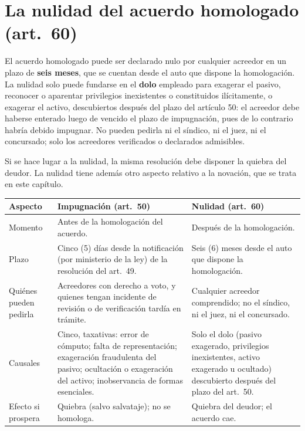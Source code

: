 \documentclass[12pt,oneside]{book}
\begin{document}
\section{La nulidad del acuerdo homologado (art.\ 60)}

El acuerdo homologado puede ser declarado nulo por cualquier acreedor en un plazo de \textbf{seis meses}, que se cuentan desde el auto que dispone la homologación. La nulidad solo puede fundarse en el \textbf{dolo} empleado para exagerar el pasivo, reconocer o aparentar privilegios inexistentes o constituidos ilícitamente, o exagerar el activo, descubiertos después del plazo del artículo 50: el acreedor debe haberse enterado luego de vencido el plazo de impugnación, pues de lo contrario habría debido impugnar. No pueden pedirla ni el síndico, ni el juez, ni el concursado; solo los acreedores verificados o declarados admisibles.

Si se hace lugar a la nulidad, la misma resolución debe disponer la quiebra del deudor. La nulidad tiene además otro aspecto relativo a la novación, que se trata en este capítulo.

\begin{center}
\small
\begin{tabularx}{\textwidth}{P{2.6cm} Y Y}
\toprule
\textbf{Aspecto} & \textbf{Impugnación (art.\ 50)} & \textbf{Nulidad (art.\ 60)} \\
\midrule
Momento & Antes de la homologación del acuerdo. & Después de la homologación. \\
Plazo & Cinco (5) días desde la notificación (por ministerio de la ley) de la resolución del art.\ 49. & Seis (6) meses desde el auto que dispone la homologación. \\
Quiénes pueden pedirla & Acreedores con derecho a voto, y quienes tengan incidente de revisión o de verificación tardía en trámite. & Cualquier acreedor comprendido; no el síndico, ni el juez, ni el concursado. \\
Causales & Cinco, taxativas: error de cómputo; falta de representación; exageración fraudulenta del pasivo; ocultación o exageración del activo; inobservancia de formas esenciales. & Solo el dolo (pasivo exagerado, privilegios inexistentes, activo exagerado u ocultado) descubierto después del plazo del art.\ 50. \\
Efecto si prospera & Quiebra (salvo salvataje); no se homologa. & Quiebra del deudor; el acuerdo cae. \\
\bottomrule
\end{tabularx}
\end{center}
\end{document}
